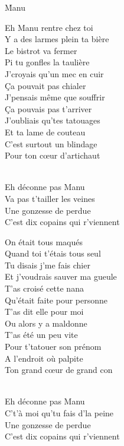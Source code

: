 \documentclass{novel}
\begin{document}
\newpage
\normalsize
\h*{Manu}
\begin{multicols}{2}
Eh Manu rentre chez toi \\
Y a des larmes plein ta bière \\
Le bistrot va fermer \\
Pi tu gonfles la taulière \\
J'croyais qu'un mec en cuir \\
Ça pouvait pas chialer \\
J'pensais même que souffrir \\
Ça pouvais pas t'arriver \\
J'oubliais qu'tes tatouages \\
Et ta lame de couteau \\
C'est surtout un blindage \\
Pour ton cœur d'artichaut \\

\begin{bfseries}
[Répétition 1:]\\
Eh déconne pas Manu \\
Va pas t'tailler les veines \\
Une gonzesse de perdue \\
C'est dix copains qui r'viennent \\
\end{bfseries}

On était tous maqués \\
Quand toi t'étais tous seul \\
Tu disais j'me fais chier \\
Et j'voudrais sauver ma gueule \\
T'as croisé cette nana \\
Qu'était faite pour personne \\
T'as dit elle pour moi \\
Ou alors y a maldonne \\
T'as été un peu vite \\
Pour t'tatouer son prénom \\
A l'endroit où palpite \\
Ton grand cœur de grand con \\


\begin{bfseries}
[Répétition 2:]\\
Eh déconne pas Manu \\
C't'à moi qu'tu fais d'la peine \\
Une gonzesse de perdue \\
C'est dix copains qui r'viennent \\
\end{bfseries}


\end{multicols}
\end{document}
